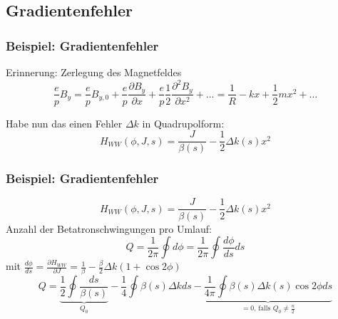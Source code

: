 \documentclass[hyperref={pdfpagelabels=false}]{beamer}
\begin{document}
\subsection{Gradientenfehler}
\begin{frame}
\frametitle{Beispiel: Gradientenfehler}

Erinnerung: Zerlegung des Magnetfeldes
\begin{equation*}
\frac{e}{p}B_y = \frac{e}{p}B_{y,0} + \frac{e}{p}\frac{\partial B_y}{\partial x} + \frac{e}{p}\frac{1}{2}\frac{\partial^2 B_y}{\partial x^2} + \dots = \frac{1}{R} - kx + \frac{1}{2} mx^2 + \dots
\end{equation*}
\pause

\vspace*{.6cm}
Habe nun das einen Fehler $\Delta k$ in Quadrupolform:
\begin{equation*}
H_{WW}(\phi,J,s) = \frac{J}{\beta(s)} - \frac{1}{2}\Delta k(s) x^2
\end{equation*}

\end{frame}
\begin{frame}
\frametitle{Beispiel: Gradientenfehler}
\begin{equation*}
H_{WW}(\phi,J,s) = \frac{J}{\beta(s)} - \frac{1}{2}\Delta k(s) x^2
\end{equation*}
Anzahl der Betatronschwingungen pro Umlauf:
\begin{equation*}
Q = \frac{1}{2\pi}\oint d\phi = \frac{1}{2\pi} \oint \frac{d\phi}{ds} ds
\end{equation*}
mit $\frac{d\phi}{ds} = \frac{\partial H_{WW}}{\partial J} = \frac{1}{\beta} - \frac{\beta}{2}\Delta k (1+\cos 2\phi)$
\pause
\begin{equation*}
Q = \underbrace{\frac{1}{2}\oint \frac{ds}{\beta(s)}}_{Q_0} - \frac{1}{4}\oint \beta(s) \Delta k ds - \underbrace{\frac{1}{4\pi}\oint\beta(s) \Delta k(s) \cos 2\phi ds}_{ = 0\text{, falls } Q_0 \neq \frac{n}{2}}
\end{equation*}
\end{frame}
\end{document}
